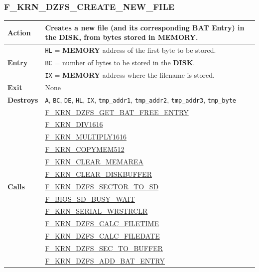 \documentclass[a4paper,11pt]{article}
\begin{document}
        \subsubsection{F\_KRN\_DZFS\_CREATE\_NEW\_FILE}
        \label{func:fkrndzfscreatenewfile}
        \begin{tabular}{l p{9cm}}
            \hline\textbf{Action}
            & Creates a new file (and its corresponding BAT Entry) in the 
            \textbf{DISK}, from bytes stored in \textbf{MEMORY}.\\
            \hline\multirow[t]{3}{4em}{\textbf{Entry}}
            & \texttt{HL} = \textbf{MEMORY} address of the first byte to be
            stored.\\
            & \texttt{BC} = number of bytes to be stored in the \textbf{DISK}.\\
            & \texttt{IX} = \textbf{MEMORY} address where the filename is
            stored.\\
            \hline\textbf{Exit} & None\\
            \hline\textbf{Destroys} & \texttt{A}, \texttt{BC}, \texttt{DE}, 
            \texttt{HL}, \texttt{IX}, \texttt{tmp\_addr1}, \texttt{tmp\_addr2},
            \texttt{tmp\_addr3}, \texttt{tmp\_byte}\\
            \hline\multirow[t]{13}{4em}{\textbf{Calls}}
            & \hyperref[func:fkrndzfsgetbatfreeentry]{F\_KRN\_DZFS\_GET\_BAT\_FREE\_ENTRY}\\
            & \hyperref[func:fkrndiv1616]{F\_KRN\_DIV1616}\\
            & \hyperref[func:fkrnmultiply1616]{F\_KRN\_MULTIPLY1616}\\
            & \hyperref[func:fkrncopymem512]{F\_KRN\_COPYMEM512}\\
            & \hyperref[func:fkrnclearmemarea]{F\_KRN\_CLEAR\_MEMAREA}\\
            & \hyperref[func:fkrncleardiskbuffer]{F\_KRN\_CLEAR\_DISKBUFFER}\\
            & \hyperref[func:fkrndzfssectortodisk]{F\_KRN\_DZFS\_SECTOR\_TO\_SD}\\
            & \hyperref[func:fbiossdbusywait]{F\_BIOS\_SD\_BUSY\_WAIT}\\
            & \hyperref[func:fkrnserialwrstrclr]{F\_KRN\_SERIAL\_WRSTRCLR}\\
            & \hyperref[func:fkrndzfscalcfiletime]{F\_KRN\_DZFS\_CALC\_FILETIME}\\
            & \hyperref[func:fkrndzfscalcfiledate]{F\_KRN\_DZFS\_CALC\_FILEDATE}\\
            & \hyperref[func:fkrndzfssectobuffer]{F\_KRN\_DZFS\_SEC\_TO\_BUFFER}\\
            & \hyperref[func:fkrndzfssectobuffer]{F\_KRN\_DZFS\_ADD\_BAT\_ENTRY}\\
            \hline
        \end{tabular}
\end{document}
